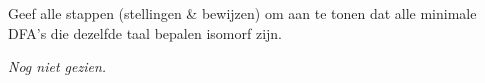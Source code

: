 \begin{question}
Geef alle stappen (stellingen \& bewijzen) om aan te tonen dat alle minimale DFA's die dezelfde taal bepalen isomorf zijn.
\end{question}

\textit{Nog niet gezien.}